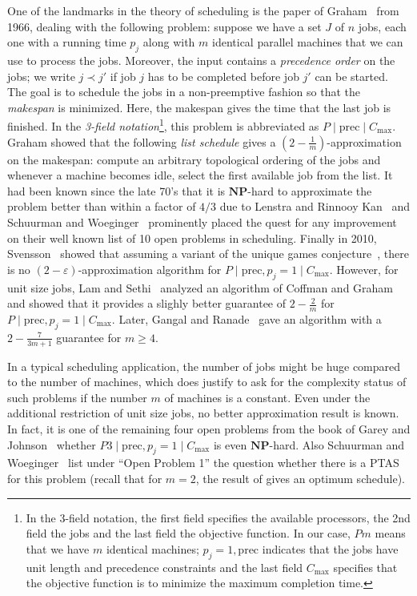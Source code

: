 \documentclass[11pt,letterpaper,oneside,english]{article}
\theoremstyle{theorem}
\begin{document}
One of the landmarks in the theory of scheduling is the paper of Graham~\cite{Graham66} from 1966,
dealing with the following problem: suppose we have a set $J$ of $n$ jobs, each one
with a running time $p_j$ along with $m$ identical parallel machines that we can use to
process the jobs. Moreover, the input contains a \emph{precedence order} 
on the jobs; we write $j \prec j'$ if job $j$ has to be completed before job $j'$
can be started. The goal is to schedule the jobs in a non-preemptive fashion so that the
\emph{makespan} is minimized. Here, the makespan gives the time that the last job is finished.
In the \emph{3-field notation}\footnote{In the 3-field notation, the first field specifies the available processors, the 2nd field the jobs and the last field the objective function. In our case, $Pm$ means that we 
have $m$ identical machines; $p_j=1, \textrm{prec}$ indicates that the jobs have unit length and precedence constraints and the last field $C_{\max}$ specifies that the objective function is to minimize the maximum completion time.}, this problem is abbreviated as $P \mid \textrm{prec} \mid C_{\max}$. Graham showed that the following \emph{list schedule} gives a $(2-\frac{1}{m})$-approximation on the makespan: compute an arbitrary topological ordering of the jobs and whenever a machine becomes idle, select the first available job from the list. It had been known since the late 70's that it is $\mathbf{NP}$-hard to approximate the problem better than within a factor of $4/3$ due to Lenstra and Rinnooy Kan~\cite{ComplexityOfScheduling-Lenstra-RinnoyKan1978} and Schuurman and Woeginger~\cite{TenOpenProblems-SchuurmanWoeginger1991} prominently placed the quest for any improvement on their well known list of 10 open problems in scheduling. Finally in 2010, Svensson~\cite{HardnessPrecedenceScheduling-Svensson-STOC2010} showed that assuming a variant of the unique games conjecture~\cite{OptLongCodeTest-BansalKhot-FOCS09}, there is no $(2-\varepsilon)$-approximation algorithm for $P \mid \textrm{prec}, p_j=1 \mid C_{\max}$. 
However, for unit size jobs, Lam and Sethi~\cite{TwoSchedulingAlgorithms-Lam-Sethi-SICOMP77} analyzed an
algorithm of Coffman and Graham and showed that it provides a slighly better guarantee of $2 - \frac{2}{m}$  for $P \mid \textrm{prec},p_j=1 \mid C_{\max}$. Later, Gangal and Ranade~\cite{PrecedenceConstrainedScheduling-GangalRanade2008} gave an algorithm with a $2 - \frac{7}{3m+1}$ guarantee for $m \geq 4$. 
 

In a typical scheduling application, the number of jobs might be huge compared to the number of machines, 
which does justify to ask for the complexity status of such problems if the number $m$ of machines
is a constant. Even under the additional restriction of unit size jobs, no better approximation result
is known. In fact, it is one of the remaining four open problems from the book of 
Garey and Johnson~\cite{GareyJohnson79}
whether $P3 \mid \textrm{prec},p_j = 1 \mid C_{\max}$ is even $\mathbf{NP}$-hard. Also
Schuurman and Woeginger~\cite{TenOpenProblems-SchuurmanWoeginger1991} list under ``Open Problem 1'' the question whether there is a PTAS for this
problem (recall that for $m=2$, the result of \cite{TwoSchedulingAlgorithms-Lam-Sethi-SICOMP77} gives an optimum schedule). 
\end{document}
